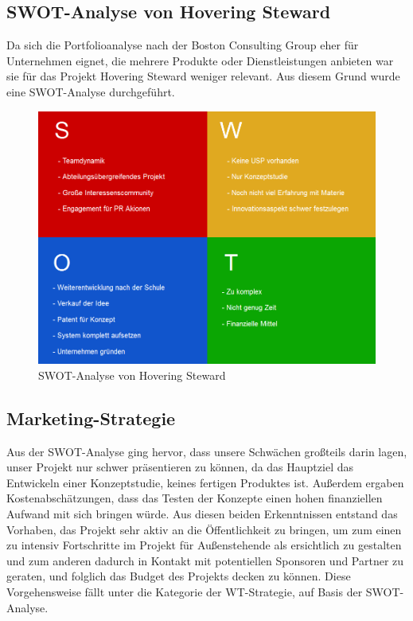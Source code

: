     \subsection*{SWOT-Analyse von Hovering Steward}
    Da sich die Portfolioanalyse nach der Boston Consulting Group eher für Unternehmen eignet, die mehrere Produkte oder Dienstleistungen anbieten war sie für das Projekt
    Hovering Steward weniger relevant. Aus diesem Grund wurde eine SWOT-Analyse durchgeführt.

    \begin{figure}[H]
      \begin{centering}
      \includegraphics[width = 1\textwidth]{Bilder/hovi_SWOT.png}
      \par\end{centering}
      \caption{SWOT-Analyse von Hovering Steward}
      \label{hoviswot}
    \end{figure}

  \subsection{Marketing-Strategie}
  Aus der SWOT-Analyse ging hervor, dass unsere Schwächen großteils darin lagen, unser Projekt nur schwer präsentieren zu können, da das Hauptziel das Entwickeln
  einer Konzeptstudie, keines fertigen Produktes ist. Außerdem ergaben Kostenabschätzungen, dass das Testen der Konzepte einen hohen finanziellen Aufwand mit sich bringen
  würde. Aus diesen beiden Erkenntnissen entstand das Vorhaben, das Projekt sehr aktiv an die Öffentlichkeit zu bringen, um zum einen zu intensiv Fortschritte im Projekt
  für Außenstehende als ersichtlich zu gestalten und zum anderen dadurch in Kontakt mit potentiellen Sponsoren und Partner zu geraten, und folglich das Budget des Projekts
  decken zu können. Diese Vorgehensweise fällt unter die Kategorie der WT-Strategie, auf Basis der SWOT-Analyse.

